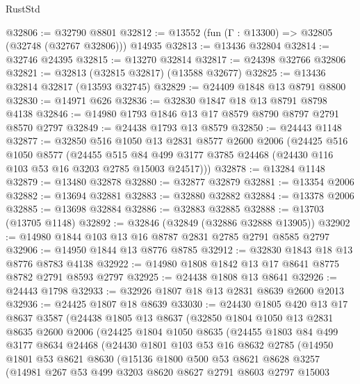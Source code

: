 \begin{lexlean}{RustStd}
\begin{coremodule}
@32806 := @32790 @8801
@32812 := @13552 (fun (Γ : @13300) => @32805 (@32748 (@32767 @32806))) @14935
@32813 := @13436 @32804
@32814 := @32746 @24395
@32815 := @13270 @32814
@32817 := @24398 @32766 @32806
@32821 := @32813 (@32815 @32817) (@13588 @32677)
@32825 := @13436 @32814 @32817 (@13593 @32745)
@32829 := @24409 @1848 @13 @8791 @8800
@32830 := @14971 @626
@32836 := @32830 @1847 @18 @13 @8791 @8798 @4138
@32846 := @14980 @1793 @1846 @13 @17 @8579 @8790 @8797 @2791 @8570 @2797
@32849 := @24438 @1793 @13 @8579
@32850 := @24443 @1148
@32877 := @32850
    @516
    @1050
    @13
    @2831
    @8577
    @2600
    @2006
    (@24425
      @516
      @1050
      @8577
      (@24455
        @515
        @84
        @499
        @3177
        @3785
        @24468
        (@24430 @116 @103 @53 @16 @3203 @2785 @15003 @24517)))
@32878 := @13284 @1148
@32879 := @13480 @32878
@32880 := @32877 @32879
@32881 := @13354 @2006
@32882 := @13694 @32881
@32883 := @32880 @32882
@32884 := @13378 @2006
@32885 := @13698 @32884
@32886 := @32883 @32885
@32888 := @13703 (@13705 @1148)
@32892 := @32846 (@32849 (@32886 @32888 @13905))
@32902 := @14980 @1844 @103 @13 @16 @8787 @2831 @2785 @2791 @8585 @2797
@32906 := @14950 @1844 @13 @8776 @8785
@32912 := @32830 @1843 @18 @13 @8776 @8783 @4138
@32922 := @14980 @1808 @1842 @13 @17 @8641 @8775 @8782 @2791 @8593 @2797
@32925 := @24438 @1808 @13 @8641
@32926 := @24443 @1798
@32933 := @32926 @1807 @18 @13 @2831 @8639 @2600 @2013
@32936 := @24425 @1807 @18 @8639
@33030 := @24430
    @1805
    @420
    @13
    @17
    @8637
    @3587
    (@24438
      @1805
      @13
      @8637
      (@32850
        @1804
        @1050
        @13
        @2831
        @8635
        @2600
        @2006
        (@24425
          @1804
          @1050
          @8635
          (@24455
            @1803
            @84
            @499
            @3177
            @8634
            @24468
            (@24430
              @1801
              @103
              @53
              @16
              @8632
              @2785
              (@14950
                @1801
                @53
                @8621
                @8630
                (@15136
                  @1800
                  @500
                  @53
                  @8621
                  @8628
                  @3257
                  (@14981
                    @267
                    @53
                    @499
                    @3203
                    @8620
                    @8627
                    @2791
                    @8603
                    @2797
                    @15003

\end{coremodule}
\end{lexlean}
